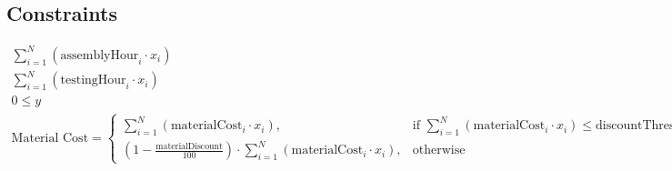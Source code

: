\documentclass{article}
\begin{document}
\subsection*{Constraints}
\begin{align}
\sum_{i=1}^{N} \left(\text{assemblyHour}_i \cdot x_i\right) & \leq \text{maxAssembly} + y, \label{assembly} \\
\sum_{i=1}^{N} \left(\text{testingHour}_i \cdot x_i\right) & \leq \text{maxTesting}, \label{testing} \\
0 \leq y & \leq \text{maxOvertimeAssembly}, \label{overtime} \\
\text{Material Cost} = 
\begin{cases} 
\sum_{i=1}^{N} \left(\text{materialCost}_i \cdot x_i\right), & \text{if } \sum_{i=1}^{N} \left(\text{materialCost}_i \cdot x_i\right) \leq \text{discountThreshold} \\
(1 - \frac{\text{materialDiscount}}{100}) \cdot \sum_{i=1}^{N} \left(\text{materialCost}_i \cdot x_i\right), & \text{otherwise}
\end{cases} \label{material_cost}
\end{align}
\end{document}
